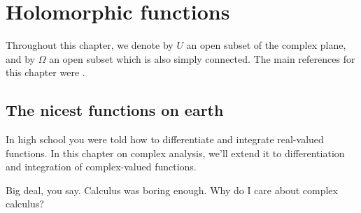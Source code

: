 \chapter{Holomorphic functions}
Throughout this chapter, we denote by $U$ an open subset of the complex plane,
and by $\Omega$ an open subset which is also simply connected.
The main references for this chapter were \cite{ref:dartmouth,ref:bak_ca}.

\section{The nicest functions on earth}
In high school you were told how to differentiate and integrate real-valued functions.
In this chapter on complex analysis,
we'll extend it to differentiation and integration of complex-valued functions.

Big deal, you say. Calculus was boring enough. Why do I care about complex calculus?

